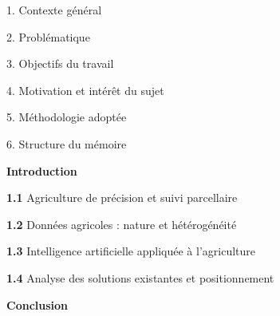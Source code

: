 \documentclass[12pt,a4paper]{report}
\begin{document}
	
	\noindent
	\colorbox{bleuPrincipal}{%
		\parbox{\linewidth}{%
			\vspace{3pt}
			\hfill{\color{white}\bfseries }
			\vspace{3pt}
		}%
	}
	
	\vspace{3pt}
	\begin{list}{}{%
			\setlength{\leftmargin}{1.5em}
			\setlength{\itemsep}{2pt}
		}
		\item 1. Contexte g\'en\'eral
		\item 2. Probl\'ematique
		\item 3. Objectifs du travail
		\item 4. Motivation et int\'er\^et du sujet
		\item 5. M\'ethodologie adopt\'ee
		\item 6. Structure du m\'emoire
	\end{list}
	
	\vspace{0.8cm}
	
	
	\noindent
	\colorbox{bleuPrincipal}{%
		\parbox{\linewidth}{%
			\vspace{3pt}
			\hfill{\color{white}\bfseries }
			\vspace{3pt}
		}%
	}
	
	\vspace{3pt}
	\begin{list}{}{%
			\setlength{\leftmargin}{0pt}
			\setlength{\itemsep}{2pt}
		}
		\item \textbf{Introduction} \dotfill
		
		\vspace{4pt}
		\item \textbf{1.1} \quad Agriculture de pr\'ecision et suivi parcellaire \dotfill
		
		\vspace{4pt}
		\item \textbf{1.2} \quad Donn\'ees agricoles : nature et h\'et\'erog\'en\'eit\'e \dotfill
		
		\vspace{4pt}
		\item \textbf{1.3} \quad Intelligence artificielle appliqu\'ee \`a l'agriculture \dotfill
		
		\vspace{4pt}
		\item \textbf{1.4} \quad Analyse des solutions existantes et positionnement \dotfill
		
		\vspace{4pt}
		\item \textbf{Conclusion} \dotfill
	\end{list}
	
\end{document}
